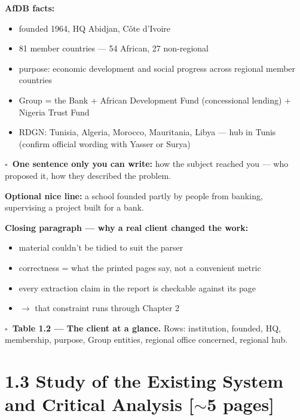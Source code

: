 \documentclass[11pt,a4paper]{article}
\newcommand{\len}[1]{\hfill\textcolor{gr}{\small[#1]}}
\newcommand{\todo}{$\square$~}
\begin{document}
\textbf{AfDB facts:}
\begin{itemize}
\item founded 1964, HQ Abidjan, C\^ote d'Ivoire
\item 81 member countries --- 54 African, 27 non-regional
\item purpose: economic development and social progress across regional member countries
\item Group = the Bank + African Development Fund (concessional lending) + Nigeria Trust Fund
\item RDGN: Tunisia, Algeria, Morocco, Mauritania, Libya --- hub in Tunis
\textcolor{gr}{\small(confirm official wording with Yasser or Surya)}
\end{itemize}

\textbf{\todo One sentence only you can write:} how the subject reached you ---
who proposed it, how they described the problem.

\textbf{Optional nice line:} a school founded partly by people from banking,
supervising a project built for a bank.

\textbf{Closing paragraph --- why a real client changed the work:}
\begin{itemize}
\item material couldn't be tidied to suit the parser
\item correctness = what the printed pages say, not a convenient metric
\item every extraction claim in the report is checkable against its page
\item $\rightarrow$ that constraint runs through Chapter 2
\end{itemize}

\textbf{\todo Table 1.2 --- The client at a glance.} Rows: institution, founded,
HQ, membership, purpose, Group entities, regional office concerned, regional hub.

\newpage
\section*{1.3 Study of the Existing System and Critical Analysis \len{$\sim$5 pages}}
\end{document}
